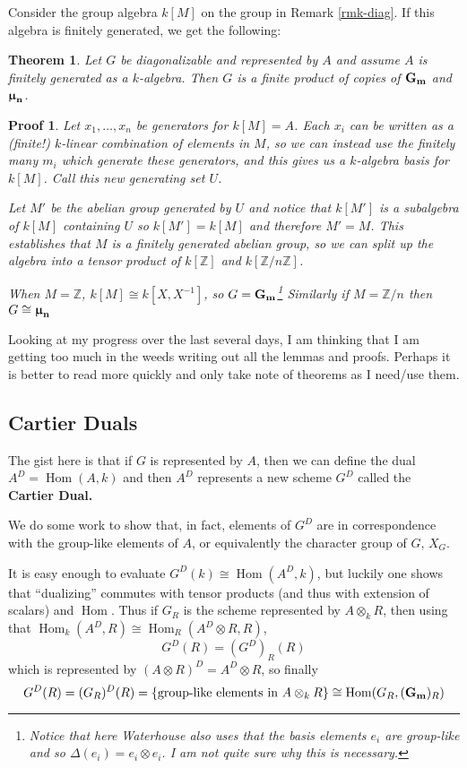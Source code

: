 \documentclass[12pt]{article}
\theoremstyle{nonumberbreak}
\theoremstyle{changebreak}
\newtheorem{thm}{Theorem}[subsection]
\theoremstyle{nonumberplain}
\newtheorem{prf}{Proof}
\theoremstyle{change}
\newcommand*{\Z}{
\mathbb{Z}
}
\DeclareMathOperator{\Hom}{Hom}
\DeclareMathOperator{\Gm}{\ensuremath\mathbf{G_m}}
\newcommand*{\mun}[1]{\ensuremath\mathbf{\bm\upmu_#1}}
\begin{document}
Consider the group algebra $k[M]$ on the group in Remark \ref{rmk-diag}. If this algebra
is finitely generated, we get the following:
\begin{thm}
	Let $G$ be diagonalizable and represented by $A$ and assume $A$ is finitely generated
	as a $k$-algebra. Then $G$ is a finite product of copies of $\Gm$ and $\mun n$.
\end{thm}
\begin{prf}
	Let $x_1,\dots, x_n$ be generators for $k[M]=A$. Each $x_i$ can be written as a (finite!)
	$k$-linear combination of elements in $M$, so we can instead use the finitely many $m_i$
	which generate these generators, and this gives us a $k$-algebra basis for $k[M]$. Call this
	new generating set $U$. 

	Let $M'$ be the abelian group generated by $U$ and notice that $k[M']$ is a subalgebra of
	$k[M]$ containing $U$ so $k[M']=k[M]$ and therefore $M'=M$. This establishes that $M$ is 
	a finitely generated abelian group, so we can split up the algebra into a tensor product
	of $k[\Z]$ and $k[\Z/n\Z]$.

	When $M=\Z$, $k[M]\cong k[X,X^{-1}]$, so $G= \Gm$\footnote{Notice that here Waterhouse also
	uses that the basis elements $e_i$ are group-like and so $\Delta(e_i)=e_i\otimes e_i$. I am not
	quite sure why this is necessary.} Similarly if $M=\Z/n$ then $G\cong \mun{n}$
\end{prf}

Looking at my progress over the last several days, I am thinking that I am getting
too much in the weeds writing out all the lemmas and proofs. Perhaps it is better to read more quickly
and only take note of theorems as I need/use them.

\subsection{Cartier Duals}
The gist here is that if $G$ is represented by $A$, then we can define the dual 
$A^D=\Hom(A,k)$ and then $A^D$ represents a new scheme $G^D$ called the \textbf{Cartier Dual.}

We do some work to show that, in fact, elements of $G^D$ are in correspondence with the 
group-like elements of $A$, or equivalently the character group of $G$, $X_G$.

It is easy enough to evaluate $G^D(k)\cong\Hom(A^D,k)$, but luckily one shows that
``dualizing'' commutes with tensor products (and thus with extension of scalars) and $\Hom$. Thus
if $G_R$ is the scheme represented by $A\otimes_k R$, then using that $\Hom_k(A^D,R)\cong\Hom_R(A^D\otimes R,R)$,
\[G^D(R)=(G^D)_R(R)\]
which is represented by $(A\otimes R)^D=A^D\otimes R$, so finally 
\[G^D(R)=(G_R)^D(R)=\{\text{group-like elements in }A\otimes_k R\}\cong \Hom(G_R,(\Gm)_R)\]
\end{document}
